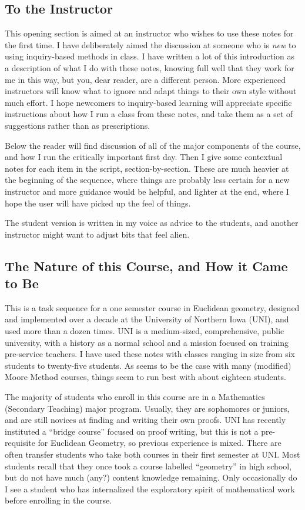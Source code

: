 \begin{annotation}
\chapter{To the Instructor}

This opening section is aimed at an instructor who wishes to use these notes for the first time.
I have deliberately aimed the discussion at someone who is \emph{new} to using inquiry-based methods in class. I have written a lot of this introduction as a description of what I do with these notes, knowing full well that they work for me in this way, but you, dear reader, are a different person.
More experienced instructors will know what to ignore and adapt things to their own style without much effort.
I hope newcomers to inquiry-based learning will appreciate specific instructions about how I run a class from these notes, and take them as a set of suggestions rather than as prescriptions.

Below the reader will find discussion of all of the major components of the course, and how I run the critically important first day.
Then I give some contextual notes for each item in the script, section-by-section. These are much heavier at the beginning of the sequence, where things are probably less certain for a new instructor and more guidance would be helpful, and lighter at the end, where I hope the user will have picked up the feel of things.

The student version is written in my voice as advice to the students, and another instructor might want to adjust bits that feel alien.

\section*{The Nature of this Course, and How it Came to Be}

This is a task sequence for a one semester course in Euclidean  geometry, designed and implemented over a decade at the University of Northern Iowa (UNI), and used more than a dozen times. UNI is a medium-sized, comprehensive, public university, with a history as a normal school and a mission focused on training pre-service teachers. 
I have used these notes with classes ranging in size from six students to twenty-five students. As seems to be the case with many (modified) Moore Method courses, things seem to run best with about eighteen students.

The majority of students who enroll in this course are in a Mathematics (Secondary Teaching) major program. Usually, they are sophomores or juniors, and are still novices at finding and writing their own proofs. UNI has recently instituted a ``bridge course'' focused on proof writing, but this is not a pre-requisite for Euclidean Geometry, so previous experience is mixed. There are often transfer students who take both courses in their first semester at UNI. Most students recall that they once took a course labelled ``geometry'' in high school, but do not have much (any?) content knowledge remaining. Only occasionally do I see a student who has internalized the exploratory spirit of mathematical work before enrolling in the course.


\end{annotation}
